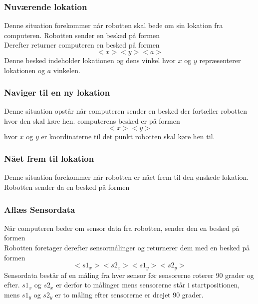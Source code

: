 \subsubsection{Nuværende lokation}
Denne situation forekommer når robotten skal bede om sin lokation fra computeren.
Robotten sender en besked på formen
\[<0>\]
Derefter returner computeren en besked på formen
\[<52><x><y><a>\]
Denne besked indeholder lokationen og dens vinkel hvor $x$ og $y$ repræsenterer lokationen og $a$ vinkelen.

\subsubsection{Naviger til en ny lokation}\label{design:protokol_navigertilny}
Denne situation opstår når computeren sender en besked der fortæller robotten hvor den skal køre hen.
computerens besked er på formen
 \[<50><x><y>\] 
hvor $x$ og $y$ er koordinaterne til det punkt robotten skal køre hen til.

\subsubsection{Nået frem til lokation}
Denne situation forekommer når robotten er nået frem til den ønskede lokation.
Robotten sender da en besked på formen \[<1>\]

\subsubsection{Aflæs Sensordata}
Når computeren beder om sensor data fra robotten, sender den en besked på formen \[<51>\]
Robotten foretager derefter sensormålinger og returnerer dem med en besked på formen  
\[<2><s1_x> <s2_x> <s1_y> <s2_y>\]
Sensordata består af en måling fra hver sensor før sensorerne roterer 90 grader og efter.
$ s1_x $ og $ s2_x $ er derfor to målinger mens sensorerne står i startpositionen, mens $ s1_y $ og $ s2_y $ er to måling efter sensorerne er drejet 90 grader.